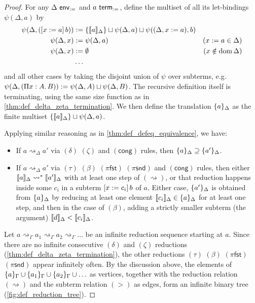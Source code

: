 \documentclass[twoside]{report}
\begin{document}
\begin{proof}
For any $\Delta \ \mathsf{env}_{:=}$ and $a \ \mathsf{term}_{:=}$, define the multiset of all its let-bindings $\psi(\Delta, a)$ by
$$
\begin{aligned}
\psi(\Delta, ([{x}:={a}]\,{b})) &:= \{\llbracket{a}\rrbracket_\Delta\} \sqcup \psi(\Delta, a) \sqcup \psi((\Delta, x := a), b) \\
\psi(\Delta, x) &:= \psi(\Delta, a) & (x := a \in \Delta) \\
\psi(\Delta, x) &:= \emptyset & (x\notin\operatorname{dom}\Delta) \\
&\ldots
\end{aligned}
$$
and all other cases by taking the disjoint union of $\psi$ over subterms, e.g. $\psi(\Delta, (\Pi{x} : {A}.\,{B})) := \psi(\Delta, A) \sqcup \psi(\Delta, B)$. The recursive definition itself is terminating, using the same size function as in \cref{thm:def_delta_zeta_termination}. We then define the translation $\{{a}\}_\Delta$ as the finite multiset $\{\llbracket{a}\rrbracket_\Delta\} \sqcup \psi(\Delta, a)$.

Applying similar reasoning as in \cref{thm:def_defeq_equivalence}, we have:

\begin{itemize}[noitemsep]
    \item If $a \rightsquigarrow_\Delta a'$ via $(\delta)$ $(\zeta)$ and $(\mathsf{cong})$ rules, then $\{{a}\}_\Delta \supseteq \{{a'}\}_\Delta$.
    \item If $a \rightsquigarrow_\Delta a'$ via $(\tau)$ $(\beta)$ $(\pi\mathsf{fst})$ $(\pi\mathsf{snd})$ and $(\mathsf{cong})$ rules, then either $\llbracket{a}\rrbracket_\Delta \rightsquigarrow^\ast \llbracket{a'}\rrbracket_\Delta$ with at least one step of $(\rightsquigarrow)$, or that reduction happens inside some $c_i$ in a subterm $[{x}:={c_i}]\,{b}$ of $a$. Either case, $\{{a'}\}_\Delta$ is obtained from $\{{a}\}_\Delta$ by reducing at least one element $\llbracket{c_i}\rrbracket_\Delta \in \{{a}\}_\Delta$ for at least one step, and then in the case of $(\beta)$, adding a strictly smaller subterm (the argument) $\llbracket{d}\rrbracket_\Delta < \llbracket{c_i}\rrbracket_\Delta$.
\end{itemize}

Let $a \rightsquigarrow_\Gamma a_1 \rightsquigarrow_\Gamma a_2 \rightsquigarrow_\Gamma \ldots$ be an infinite reduction sequence starting at $a$. Since there are no infinite consecutive $(\delta)$ and $(\zeta)$ reductions (\cref{thm:def_delta_zeta_termination}), the other reductions $(\tau)$ $(\beta)$ $(\pi\mathsf{fst})$ $(\pi\mathsf{snd})$ appear infinitely often. By the discussion above, the elements of $\{{a}\}_\Gamma \cup \{{a_1}\}_\Gamma \cup \{{a_2}\}_\Gamma \cup \ldots$ as vertices, together with the reduction relation $(\rightsquigarrow)$ and the subterm relation $(>)$ as edges, form an infinite binary tree (\cref{fig:def_reduction_tree}).


\end{proof}
\end{document}
